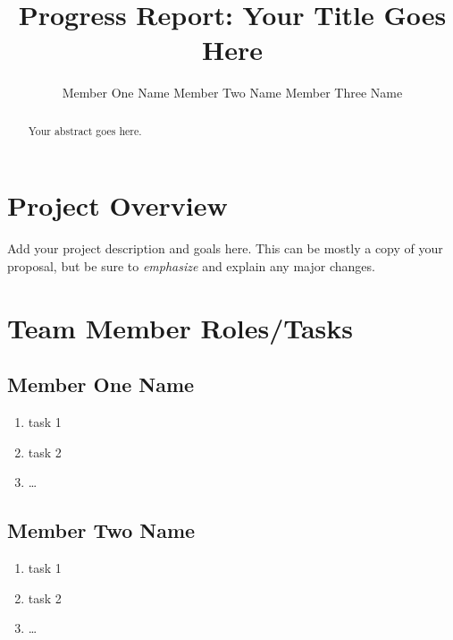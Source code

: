 \documentclass[10pt,twocolumn,letterpaper]{article}
\begin{document}
\title{Progress Report: Your Title Goes Here}

\author{
  Member One Name \hspace{1in} Member Two Name \hspace{1in} Member Three Name
}
\maketitle

\begin{abstract}
  Your abstract goes here.
\end{abstract}

\section{Project Overview}

Add your project description and goals here. This can be mostly a copy of your proposal, but be sure to \emph{emphasize} and explain any major changes.

\section{Team Member Roles/Tasks}
\label{sec:roles}

\subsection{Member One Name}

\begin{enumerate}

  \item task 1
  \item task 2
  \item \ldots

\end{enumerate}

\subsection{Member Two Name}

\begin{enumerate}

  \item task 1
  \item task 2
  \item \ldots

\end{enumerate}
\end{document}
